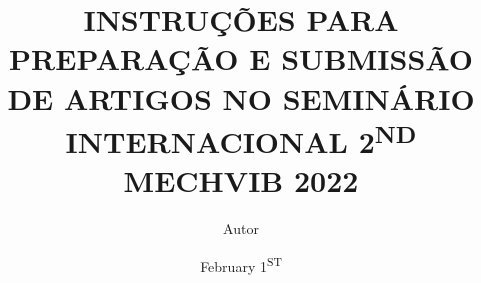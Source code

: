 \documentclass{ASD_LaTeX}
\title{INSTRUÇÕES PARA PREPARAÇÃO E SUBMISSÃO DE ARTIGOS NO SEMINÁRIO INTERNACIONAL 2\textsuperscript{ND} MECHVIB 2022}
\author{Autor}              %
\date{February 1\textsuperscript{ST}}   %
\begin{document}

    \biblio
\end{document}
